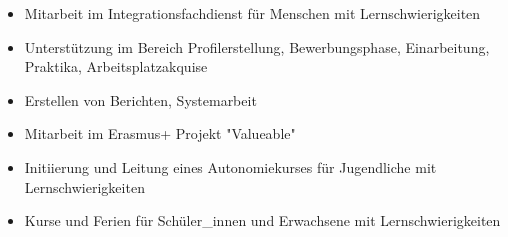 \documentclass[10pt,a4paper]{altacv}
\begin{document}
  \divider

  \divider

  \divider

  \divider

  \begin{itemize}
    \item{Mitarbeit im Integrationsfachdienst für Menschen mit Lernschwierigkeiten}
    \item{Unterstützung im Bereich Profilerstellung, Bewerbungsphase, Einarbeitung, Praktika, Arbeitsplatzakquise}
    \item {Erstellen von Berichten, Systemarbeit}
    \item {Mitarbeit im Erasmus+ Projekt "Valueable"}
  \end{itemize}
  \divider

  \begin{itemize}
    \item{Initiierung und Leitung eines Autonomiekurses für Jugendliche mit Lernschwierigkeiten}
    \item {Kurse und Ferien für Schüler\_innen und Erwachsene mit Lernschwierigkeiten}
  \end{itemize}
  \divider
\end{document}
